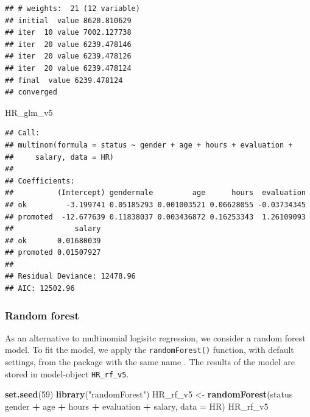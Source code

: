 \documentclass[12pt,]{krantz}
\newenvironment{Shaded}{\begin{snugshade}}{\end{snugshade}}
\newcommand{\DataTypeTok}[1]{\textcolor[rgb]{0.13,0.29,0.53}{#1}}
\newcommand{\DecValTok}[1]{\textcolor[rgb]{0.00,0.00,0.81}{#1}}
\newcommand{\KeywordTok}[1]{\textcolor[rgb]{0.13,0.29,0.53}{\textbf{#1}}}
\newcommand{\NormalTok}[1]{#1}
\newcommand{\OperatorTok}[1]{\textcolor[rgb]{0.81,0.36,0.00}{\textbf{#1}}}
\newcommand{\StringTok}[1]{\textcolor[rgb]{0.31,0.60,0.02}{#1}}
\theoremstyle{definition}
\theoremstyle{definition}
\theoremstyle{definition}
\theoremstyle{remark}
\begin{document}
\begin{verbatim}
## # weights:  21 (12 variable)
## initial  value 8620.810629 
## iter  10 value 7002.127738
## iter  20 value 6239.478146
## iter  20 value 6239.478126
## iter  20 value 6239.478124
## final  value 6239.478124 
## converged
\end{verbatim}

\begin{Shaded}
\begin{Highlighting}[]
\NormalTok{HR_glm_v5}
\end{Highlighting}
\end{Shaded}

\begin{verbatim}
## Call:
## multinom(formula = status ~ gender + age + hours + evaluation + 
##     salary, data = HR)
## 
## Coefficients:
##          (Intercept) gendermale         age      hours  evaluation
## ok         -3.199741 0.05185293 0.001003521 0.06628055 -0.03734345
## promoted  -12.677639 0.11838037 0.003436872 0.16253343  1.26109093
##              salary
## ok       0.01680039
## promoted 0.01507927
## 
## Residual Deviance: 12478.96 
## AIC: 12502.96
\end{verbatim}

\hypertarget{model_HR_rf}{%
\subsubsection{Random forest}\label{model_HR_rf}}

As an alternative to multinomial logisitc regression, we consider a
random forest model. To fit the model, we apply the
\texttt{randomForest()} function, with default settings, from the
package with the same name \citep{randomForestRNews}. The results of the
model are stored in model-object \texttt{HR\_rf\_v5}.

\begin{Shaded}
\begin{Highlighting}[]
\KeywordTok{set.seed}\NormalTok{(}\DecValTok{59}\NormalTok{)}
\KeywordTok{library}\NormalTok{(}\StringTok{"randomForest"}\NormalTok{)}
\NormalTok{HR_rf_v5 <-}\StringTok{ }\KeywordTok{randomForest}\NormalTok{(status }\OperatorTok{~}\StringTok{ }\NormalTok{gender }\OperatorTok{+}\StringTok{ }\NormalTok{age }\OperatorTok{+}\StringTok{ }\NormalTok{hours }\OperatorTok{+}\StringTok{ }\NormalTok{evaluation }\OperatorTok{+}\StringTok{ }\NormalTok{salary, }\DataTypeTok{data =}\NormalTok{ HR)}
\NormalTok{HR_rf_v5}
\end{Highlighting}
\end{Shaded}
\end{document}
